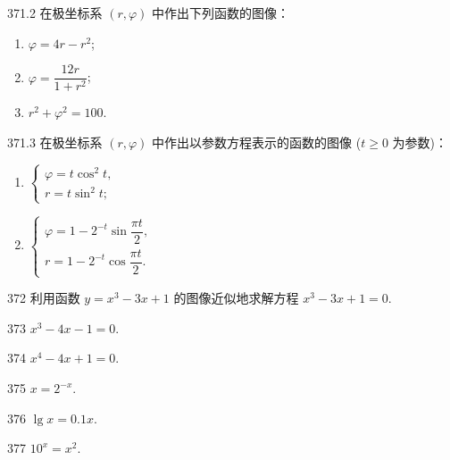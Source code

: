 \begin{prob}[L]{371.2}
在极坐标系 $(r, \varphi)$ 中作出下列函数的图像：
\begin{enumerate}[label=(\alph*), itemsep=2pt, topsep=3pt]
  \item $\varphi = 4r - r^2$;
  \item $\varphi = \dfrac{12r}{1 + r^2}$;
  \item $r^2 + \varphi^2 = 100$.
\end{enumerate}
\end{prob}

\begin{prob}[M]{371.3}
在极坐标系 $(r, \varphi)$ 中作出以参数方程表示的函数的图像 ($t \geqslant 0$ 为参数)：
\begin{enumerate}[label=(\alph*), itemsep=2pt, topsep=3pt]
  \item $\begin{cases} \varphi = t\cos^2 t, \\ r = t\sin^2 t; \end{cases}$
  \item $\begin{cases} \varphi = 1 - 2^{-t}\sin\dfrac{\pi t}{2}, \\ r = 1 - 2^{-t}\cos\dfrac{\pi t}{2}. \end{cases}$
\end{enumerate}
\end{prob}

\begin{prob}[M]{372}
利用函数 $y = x^3 - 3x + 1$ 的图像近似地求解方程 $x^3 - 3x + 1 = 0$.
\end{prob}


\begin{prob}[S]{373}
$x^3 - 4x - 1 = 0$.
\end{prob}

\begin{prob}[S]{374}
$x^4 - 4x + 1 = 0$.
\end{prob}

\begin{prob}[S]{375}
$x = 2^{-x}$.
\end{prob}

\begin{prob}[S]{376}
$\lg x = 0.1x$.
\end{prob}

\begin{prob}[S]{377}
$10^x = x^2$.
\end{prob}

